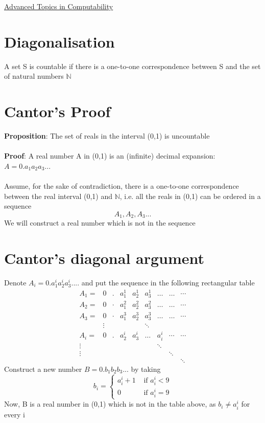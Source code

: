 \documentclass{article}[18pt]
\begin{document}
\begin{center}
\underline{\huge Advanced Topics in Computability}
\end{center}
\section{Diagonalisation}
\begin{defin}[Countable]
A set S is countable if there is a one-to-one correspondence between S and the set of natural numbers $\mathbb{N}$
\end{defin}
\section{Cantor's Proof}
\textbf{Proposition}: The set of reals in the interval (0,1) is uncountable\\
\\
\textbf{Proof}: A real number A in (0,1) is an (infinite) decimal expansion: $A=0.a_1a_2a_3...$\\
\\
Assume, for the sake of contradiction, there is a one-to-one correspondence between the real interval (0,1) and $\mathbb{N}$, i.e. all the reals in (0,1) can be ordered in a sequence
$$A_1,A_2,A_3...$$
We will construct a real number which is not in the sequence
\section{Cantor's diagonal argument}
Denote $A_i=0.a_1^ia_2^ia_3^i....$ and put the sequence in the following rectangular table
\[
\begin{array}{lllllllll}{A_{1}=} & {0} & {.} & {a_{1}^{1}} & {a_{2}^{1}} & {a_{3}^{1}} & {\ldots} & {\ldots} & {\cdots} \\
 {A_{2}=} & {0} & {\cdot} & {a_{1}^{2}} & {a_{2}^{2}} & {a_{3}^{2}} & {\ldots} & {\ldots} & {\cdots} \\
  {A_{3}=} & {0} & {\cdot} & {a_{1}^{3}} & {a_{2}^{3}} & {a_{3}^{3}} & {\ldots} & {\ldots} & {\cdots} \\
   {} & {\vdots} & {} & {} & {} & {\ddots} & {} \\
    {A_{i}=} & {0} & {.} & {a_{2}^{i}} & {a_{3}^{i}} & {\ldots} & {a_{i}^{i}} & {\cdots} & {\cdots} \\
     {\vdots} & {} & {} & {} & {} & {} & {\ddots} & {} \\
      {\vdots} & {} & {} & {} & {} & {} && {\ddots} \\
       {} & {} & {} & {} & {} &  & &&{\ddots}\end{array}
\]
Construct a new number $B=0.b_1b_2b_3...$ by taking
\[
b_{i}=\left\{\begin{array}{ll}{a_{i}^{i}+1} & {\text { if } a_{i}^{i}<9} \\ {0} & {\text { if } a_{i}^{i}=9}\end{array}\right.
\]
Now, B is a real number in (0,1) which is not in the table above, as $b_i\neq a_i^i$ for every i
\end{document}
